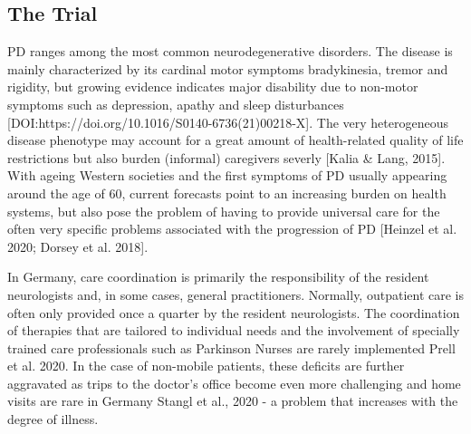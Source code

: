 \documentclass[number,12pt,review]{elsarticle}
\begin{document}
\label{backsec}

\subsection{The Trial}

\label{trialsec}

\ac{PD} ranges among the most common neurodegenerative disorders. The disease is mainly characterized by its cardinal motor symptoms bradykinesia, tremor and rigidity, but growing evidence indicates major disability due to non-motor symptoms such as depression, apathy and sleep disturbances \citet{} [DOI:https://doi.org/10.1016/S0140-6736(21)00218-X]. The very heterogeneous disease phenotype may account for a great amount of health-related quality of life restrictions but also burden (informal) caregivers severly \citet{} [Kalia \& Lang, 2015]. With ageing Western societies and the first symptoms of \ac{PD} usually appearing around the age of 60, current forecasts point to an increasing burden on health systems, but also pose the problem of having to provide universal care for the often very specific problems associated with the progression of \ac{PD} [Heinzel et al. 2020; Dorsey et al. 2018].

In Germany, care coordination is primarily the responsibility of the resident neurologists and, in some cases, general practitioners. Normally, outpatient care is often only provided once a quarter by the resident neurologists. The coordination of therapies that are tailored to individual needs and the involvement of specially trained care professionals such as Parkinson Nurses are rarely implemented Prell et al. 2020.
In the case of non-mobile patients, these deficits are further aggravated as trips to the doctor's office become even more challenging and home visits are rare in Germany Stangl et al., 2020 - a problem that increases with the degree of illness.
\end{document}
